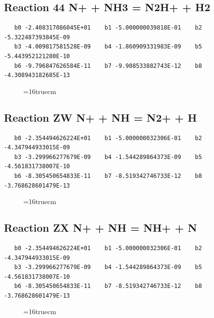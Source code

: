 \documentclass[12pt,dvipdfm]{article}
\begin{document}
\subsection{
Reaction 44 N+ + NH3 = N2H+ + H2}
\begin{small}\begin{verbatim}
   b0 -2.408317086045E+01    b1 -5.000000039818E-01    b2 -5.322487393845E-09
   b3 -4.009817581528E-09    b4 -1.860909331983E-09    b5 -5.443952121280E-10
   b6 -9.796847626584E-11    b7 -9.908533882743E-12    b8 -4.308943182685E-13
   \end{verbatim}\end{small}
\begin{figure}[h!]
\label{n2rates}
\epsfxsize=16truecm
\end{figure}
\newpage

\subsection{
Reaction ZW N+ + NH = N2+ + H}
\begin{small}\begin{verbatim}
   b0 -2.354494626224E+01    b1 -5.000000032306E-01    b2 -4.347944933015E-09
   b3 -3.299966277679E-09    b4 -1.544289864373E-09    b5 -4.561831738007E-10
   b6 -8.305450654833E-11    b7 -8.519342746733E-12    b8 -3.768628601479E-13
   \end{verbatim}\end{small}
\begin{figure}[h!]
\label{n2rates}
\epsfxsize=16truecm
\end{figure}
\newpage

\subsection{
Reaction ZX N+ + NH = NH+ + N}
\begin{small}\begin{verbatim}
   b0 -2.354494626224E+01    b1 -5.000000032306E-01    b2 -4.347944933015E-09
   b3 -3.299966277679E-09    b4 -1.544289864373E-09    b5 -4.561831738007E-10
   b6 -8.305450654833E-11    b7 -8.519342746733E-12    b8 -3.768628601479E-13
   \end{verbatim}\end{small}
\begin{figure}[h!]
\label{n2rates}
\epsfxsize=16truecm
\end{figure}
\newpage
\end{document}
